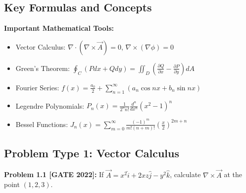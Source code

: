 \documentclass[12pt,a4paper]{article}
\begin{document}
\subsection{Key Formulas and Concepts}

\begin{theorem}
\textbf{Important Mathematical Tools:}
\begin{itemize}
    \item Vector Calculus: $\nabla \cdot (\nabla \times \vec{A}) = 0$, $\nabla \times (\nabla \phi) = 0$
    \item Green's Theorem: $\oint_C (P dx + Q dy) = \iint_D \left(\frac{\partial Q}{\partial x} - \frac{\partial P}{\partial y}\right) dA$
    \item Fourier Series: $f(x) = \frac{a_0}{2} + \sum_{n=1}^{\infty} (a_n \cos nx + b_n \sin nx)$
    \item Legendre Polynomials: $P_n(x) = \frac{1}{2^n n!} \frac{d^n}{dx^n}(x^2-1)^n$
    \item Bessel Functions: $J_n(x) = \sum_{m=0}^{\infty} \frac{(-1)^m}{m!(n+m)!}\left(\frac{x}{2}\right)^{2m+n}$
\end{itemize}
\end{theorem}

\subsection{Problem Type 1: Vector Calculus}

\textbf{Problem 1.1 [GATE 2022]:} If $\vec{A} = x^2\hat{i} + 2xz\hat{j} - y^2\hat{k}$, calculate $\nabla \times \vec{A}$ at the point $(1, 2, 3)$.
\end{document}
